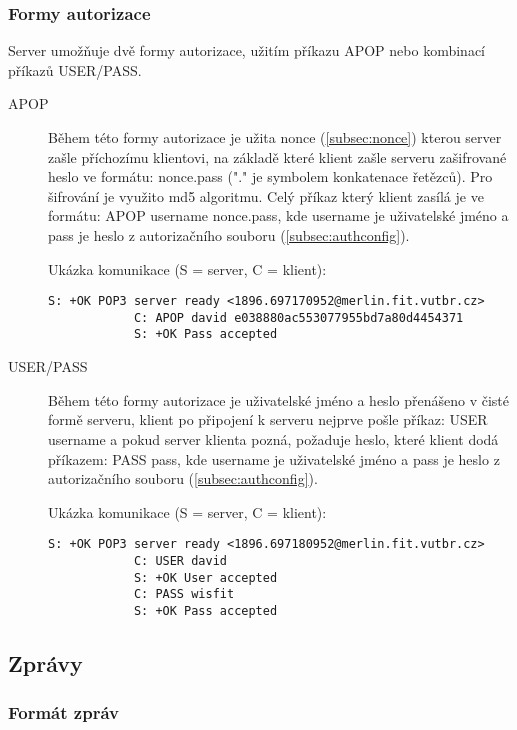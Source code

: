 \documentclass[11pt,a4paper]{report}
\begin{document}
    \subsubsection{Formy autorizace}
    \label{subsec:authmethods}
    Server umožňuje dvě formy autorizace, užitím příkazu APOP nebo kombinací příkazů USER/PASS.
    \begin{description}
        \item [APOP] Během této formy autorizace je užita nonce (\ref{subsec:nonce}) kterou server zašle příchozímu klientovi, na základě které klient zašle serveru zašifrované heslo ve formátu: nonce.pass ("." je symbolem konkatenace řetězců). Pro šifrování je využito md5 algoritmu. Celý příkaz který klient zasílá je ve formátu: APOP username nonce.pass, kde username je uživatelské jméno a pass je heslo z autorizačního souboru (\ref{subsec:authconfig}).\par
        Ukázka komunikace (S = server, C = klient):
        \begin{lstlisting}[frame=trBL]
            S: +OK POP3 server ready <1896.697170952@merlin.fit.vutbr.cz>
            C: APOP david e038880ac553077955bd7a80d4454371
            S: +OK Pass accepted
        \end{lstlisting}\par
        \item [USER/PASS] Během této formy autorizace je uživatelské jméno a heslo přenášeno v čisté formě serveru, klient po připojení k serveru nejprve pošle příkaz: USER username a pokud server klienta pozná, požaduje heslo, které klient dodá příkazem: PASS pass, kde username je uživatelské jméno a pass je heslo z autorizačního souboru (\ref{subsec:authconfig}).\par
        Ukázka komunikace (S = server, C = klient):
        \begin{lstlisting}[frame=trBL]
            S: +OK POP3 server ready <1896.697180952@merlin.fit.vutbr.cz>
            C: USER david
            S: +OK User accepted
            C: PASS wisfit
            S: +OK Pass accepted
        \end{lstlisting}
    \end{description}

    \subsection{Zprávy}
    \label{subsec:mails}
    \subsubsection{Formát zpráv}
    \label{subsec:mailformat}
\end{document}
